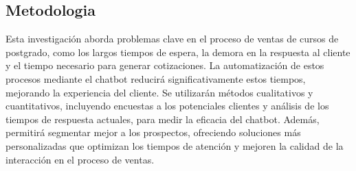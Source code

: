 \documentclass[10pt,a4paper]{article}
\begin{document}
    \subsection{Metodologia}
	Esta investigación aborda problemas clave en el proceso de ventas de cursos de postgrado, como los largos tiempos de espera, la demora en la respuesta al cliente y el tiempo necesario para generar cotizaciones. La automatización de estos procesos mediante el chatbot reducirá significativamente estos tiempos, mejorando la experiencia del cliente. Se utilizarán métodos cualitativos y cuantitativos, incluyendo encuestas a los potenciales clientes y análisis de los tiempos de respuesta actuales, para medir la eficacia del chatbot. Además, permitirá segmentar mejor a los prospectos, ofreciendo soluciones más personalizadas que optimizan los tiempos de atención y mejoren la calidad de la interacción en el proceso de ventas.

	
\end{document}

